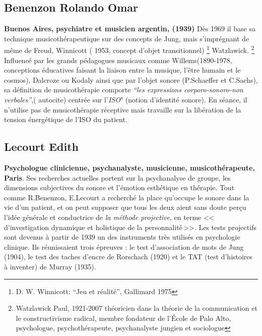           

         

  \subsection{Benenzon Rolando Omar} 
	\textbf{ Buenos Aires, psychiatre et
    musicien argentin, (1939)}
	  \label{benenzon}
	  Dès 1969 il base sa technique 
	  musicothérapeutique sur des concepts 
	  de Jung, mais s'imprégnant de même de Freud, Winnicott (
          1953, concept d'objet transitionnel) \footnote{
          D. W. Winnicott: ``Jeu et réalité'', Gallimard 1975 }
          Watzlawick. \footnote{ Watzlawick Paul, 1921-2007  théoricien dans la théorie de la communication et le constructivisme radical, membre fondateur de l'École de Palo Alto, psychologue, psychothérapeute, psychanalyste jungien et sociologue} 
	  Influencé par les grands  pédagogues musicaux comme
          Willems(1890-1978, conceptions éducatives faisant la liaison
          entre la musique, l'être humain et le cosmos),
          Dalcroze ou Kodaly ainsi que par l'objet sonore (P.Schaeffer
          et C.Sachs), sa définition de musicothérapie comporte  
	  \emph{\textsl{ ``les expressions corporo-sonoro-non verbales''}},( autocite)
	  centrée sur l'\textit{ISO}" (notion
          d'identité sonore). En séance, il n'utilise pas de
          musicothérapie réceptive mais travaille sur la libération de
          la tension énergétique de l'ISO du patient.

        \subsection{Lecourt Edith}
      \textbf{Psychologue clinicienne,
          psychanalyste, musicienne, musicothérapeute, Paris}. Ses recherches
        actuelles portent sur la psychanalyse de groupe, les
        dimensions subjectives du sonore  et l'émotion esthétique en thérapie.
   Tout comme R.Benenzon, E.Lecourt a recherché  la place qu'occupe le sonore dans la vie d'un 
        patient, et on peut supposer que tous les deux aient sans doute perçu l'idée générale et 
        conductrice de \emph{la méthode projective}, 
        en terme 
	    <<\,d'investigation dynamique et holistique de la
            personnalité\,>>.
            Les tests projectifs sont devenus à partir
        de 1939 un des instruments très utilisés en psychologie
        clinique. Ils réunissaient trois épreuves : le test
        d'association de mots de Jung (1904), le test des taches
        d'encre de Rorschach (1920) et le TAT (test d'histoires à
        inventer) de Murray (1935)\autocite[ch.~1, p.~13]{anzieu.chabert:methodes}.

